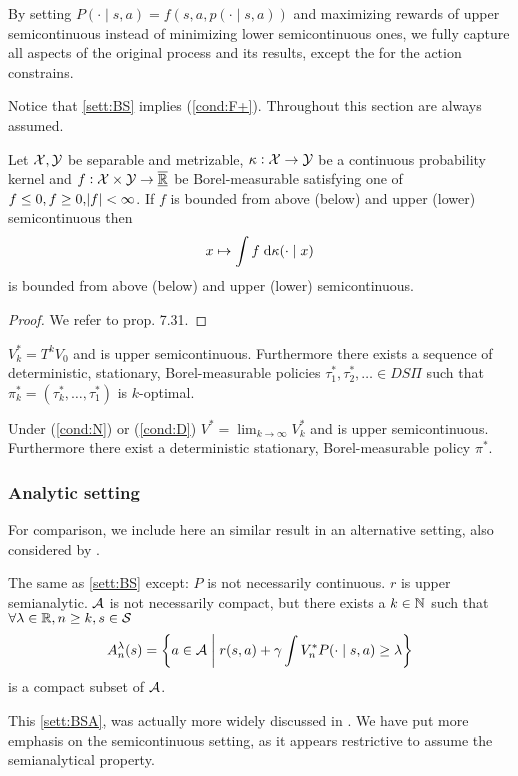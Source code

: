 By setting $P(\cdot \mid s, a) = f(s, a, p(\cdot \mid s, a))$
and maximizing rewards of upper semicontinuous instead of
minimizing lower semicontinuous ones, we fully capture
all aspects of the original process and its results,
except the for the action constrains. %

Notice that \cref{sett:BS} implies (\cref{cond:F+}).
Throughout this section 
are always assumed. 

\begin{prop}
  Let $\mathcal{X}, \mathcal{Y}$ be separable and metrizable,
  $\kappa : \mathcal{X} \to \mathcal{Y}$ be a continuous probability kernel
  and $f:\mathcal{X} \times \mathcal{Y} \to \underline{\overline{\mathbb{R}}}$ be Borel-measurable
  satisfying one of
  $f \leq 0, f \geq 0, \abs{f} < \infty$.
  If $f$ is bounded from above (below) and upper (lower) semicontinuous
  then
  \[ x \mapsto \int f \; \mathrm{d} \kappa(\cdot \mid x) \]
  is bounded from above (below) and upper (lower) semicontinuous. 
  \label{prop:BS7_31}
\end{prop}
\begin{proof}
We refer to  prop. 7.31. %
\end{proof}

\begin{prop}[Prop. 8.6 in BS]
  $V^*_k = T^k V_0$ and is upper semicontinuous.
  Furthermore there exists a sequence of deterministic, stationary,
  Borel-measurable policies
  $\tau^*_1, \tau^*_2, \dots \in DS\Pi$
  such that $\pi^*_k = (\tau^*_k, \dots, \tau^*_1)$ is $k$-optimal.
  \label{prop:BSprop8_6}
\end{prop}

\begin{thm}[Cor. 9.17.2 in BS]
  Under (\cref{cond:N}) or (\cref{cond:D})
  $V^* = \lim_{k\to\infty} V_k^*$ and is upper semicontinuous.
  Furthermore there exist a deterministic
  stationary, Borel-measurable policy $\pi^*$.
  \label{thm:BScor9.17.2}
\end{thm}

\subsubsection{Analytic setting}
For comparison, we include here an similar result in an alternative setting,
also considered by .

\begin{sett}[BS Analytic]
  The same as \cref{sett:BS} except:
  $P$ is not necessarily continuous.
  $r$ is upper semianalytic.
  $\mathcal{A}$ is not necessarily compact, but
  there exists a $k \in \mathbb{N}$ such that
  $\forall \lambda \in \mathbb{R}, n \geq k, s \in \mathcal{S}$
  \[ A^\lambda_n(s) = \left\{ a \in \mathcal{A} \;\middle\vert\; r(s, a)
  + \gamma \int V^*_n P(\cdot \mid s, a) \geq \lambda \right\} \]
  is a compact subset of $\mathcal{A}$.
  \label{sett:BSA}
\end{sett}
This \cref{sett:BSA}, was actually more widely discussed in .
We have put more emphasis on the semicontinuous setting, as it
appears restrictive to assume the semianalytical property.

